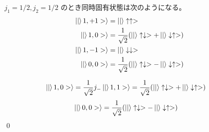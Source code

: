 \documentclass[uplatex,dvipdfmx,a4paper,11pt]{jlreq}
\makeatletter
\numberwithin{equation}{section}
\theoremstyle{definition}
\renewenvironment{proof}[1][\proofname]{\par
  \normalfont
  \topsep6\p@\@plus6\p@ \trivlist
  \item[\hskip\labelsep{\bfseries #1}\@addpunct{\bfseries}]\ignorespaces\quad\par
}{%
  \qed\endtrivlist\@endpefalse
}
\renewcommand\proofname{証明}
\makeatother
\begin{document}
\begin{proposition}
  $j_1 = 1/2, j_2 = 1/2$ のとき同時固有状態は次のようになる。
  \begin{align}
    \ket|1, +1>\rangle & = \ket|\uparrow\uparrow>                                                      \\
    \ket|1, 0>\rangle  & = \frac{1}{\sqrt{2}}\qty(\ket|\uparrow\downarrow> + \ket|\downarrow\uparrow>) \\
    \ket|1, -1>\rangle & = \ket|\downarrow\downarrow>                                                  \\
    \ket|0, 0>\rangle  & = \frac{1}{\sqrt{2}}\qty(\ket|\uparrow\downarrow> - \ket|\downarrow\uparrow>)
  \end{align}
\end{proposition}
\begin{proof}

  \begin{align}
    \ket|1, 0>\rangle & = \frac{1}{\sqrt{2}}j_-\ket|1, 1>\rangle = \frac{1}{\sqrt{2}}\qty(\ket|\uparrow\downarrow> + \ket|\downarrow\uparrow>)
  \end{align}
  \begin{align}
    \ket|0, 0>\rangle & = \frac{1}{\sqrt{2}}\qty(\ket|\uparrow\downarrow> - \ket|\downarrow\uparrow>)
  \end{align}
\end{proof}
\end{document}
